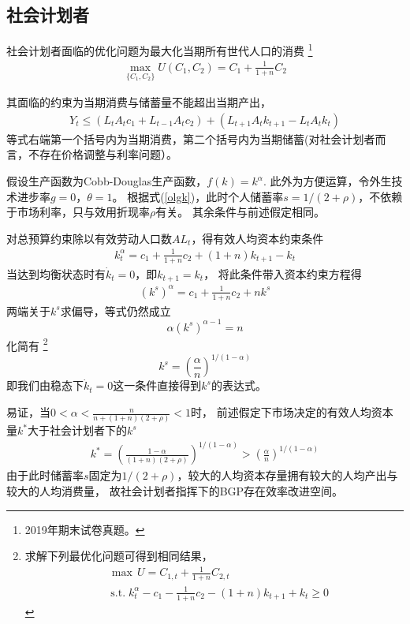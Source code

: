 \documentclass[cn,normal,11pt,black]{elegantnote}
\begin{document}
\subsection{社会计划者}  \label{socialplanolg}

社会计划者面临的优化问题为最大化当期所有世代人口的消费
\footnote{2019年期末试卷真题。}
\begin{align}
    \max_{\{C_1,C_2\}} U(C_1,C_2) = C_1 + \frac{1}{1+n} C_2
\end{align}

其面临的约束为当期消费与储蓄量不能超出当期产出，
\begin{align}
    Y_t \le (L_t A_t c_1 + L_{t-1} A_t c_2) +  (L_{t+1} A_t k_{t+1} - L_t A_t k_t)
\end{align}
等式右端第一个括号内为当期消费，第二个括号内为当期储蓄(对社会计划者而言，不存在价格调整与利率问题）。

假设生产函数为Cobb-Douglas生产函数，$f(k)=k^\alpha$.
此外为方便运算，令外生技术进步率$g=0$，$\theta = 1$。
根据式(\ref{olgk})，此时个人储蓄率$s = 1/(2+\rho)$，不依赖于市场利率，只与效用折现率$\rho$有关。
其余条件与前述假定相同。

对总预算约束除以有效劳动人口数$A L_t$，得有效人均资本约束条件
\begin{align}
    k_t^\alpha = c_1 + \frac{1}{1+n}c_2 + (1+n)k_{t+1} - k_t
\end{align}
当达到均衡状态时有$\dot{k}_t = 0$，即$k_{t+1} = k_t$，
将此条件带入资本约束方程得
\begin{align}
    (k^s)^\alpha = c_1 + \frac{1}{1+n} c_2 + n k^s
\end{align}
两端关于$k^s$求偏导，等式仍然成立
\begin{equation}
  \alpha (k^s)^{\alpha -1} = n
\end{equation}
化简有
\footnote{
求解下列最优化问题可得到相同结果，
\begin{align*}
    & \max \, U  = C_{1,t} + \frac{1}{1+n} C_{2,t} \\
    & \, \mathrm{s.t.} \; k_t^\alpha - c_1 - \frac{1}{1+n}c_2 - (1+n)k_{t+1} + k_t \geq 0
\end{align*}}
\begin{equation}
    k^s = \left(\frac{\alpha}{n} \right)^{1/(1-\alpha)}
\end{equation}
即我们由稳态下$\dot{k}_t = 0$这一条件直接得到$k^s$的表达式。

易证，当$0< \alpha < \frac{n}{n + (1+n)(2+\rho)} <1$时，
前述假定下市场决定的有效人均资本量$k^*$大于社会计划者下的$k^{s}$
\begin{align}
    k^* = \left(\frac{ 1- \alpha}{(1+n)(2+\rho)} \right)^{1/(1-\alpha)} > 
        \left(\frac{\alpha}{n} \right)^{1/(1-\alpha)}
\end{align}
由于此时储蓄率$s$固定为$1/(2+\rho)$，较大的人均资本存量拥有较大的人均产出与较大的人均消费量，
故社会计划者指挥下的BGP存在效率改进空间。
\end{document}
